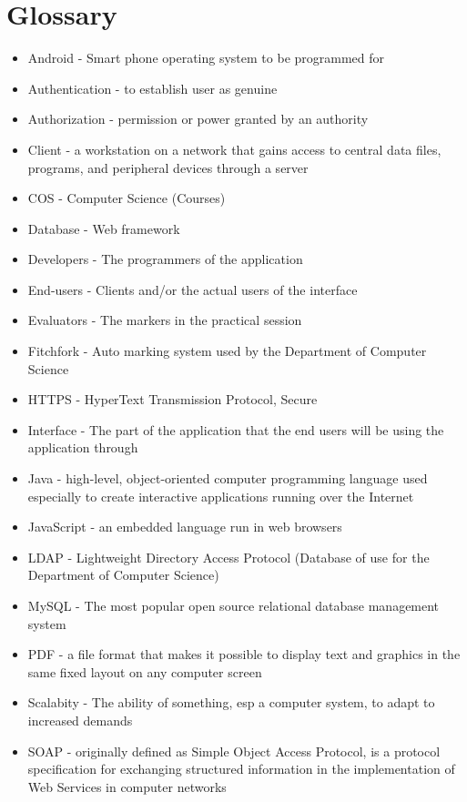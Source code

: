 \section{Glossary}
\begin{itemize}

\item Android - Smart phone operating system to be programmed for
\item Authentication - to establish user as genuine
\item Authorization - permission or power granted by an authority
\item Client - a workstation on a network that gains access to central data files, programs, and peripheral devices through a server
\item COS - Computer Science (Courses)
\item Database - Web framework
\item Developers - The programmers of the application
\item End-users - Clients and/or the actual users of the interface
\item Evaluators - The markers in the practical session
\item Fitchfork - Auto marking system used by the Department of Computer Science
\item HTTPS - HyperText Transmission Protocol, Secure 
\item Interface - The part of the application that the end users will be using the application through
\item Java -  high-level, object-oriented computer programming language used especially to create interactive applications running over the Internet
\item JavaScript - an embedded language run in web browsers
\item LDAP - Lightweight Directory Access Protocol (Database of use for the Department of Computer Science)
\item MySQL - The most popular open source relational database management system
\item PDF - a file format that makes it possible to display text and graphics in the same fixed layout on any computer screen
\item Scalabity - The ability of something, esp a computer system, to adapt to increased demands
\item SOAP - originally defined as Simple Object Access Protocol, is a protocol specification for exchanging structured information in the implementation of Web Services in computer networks


\end{itemize}
